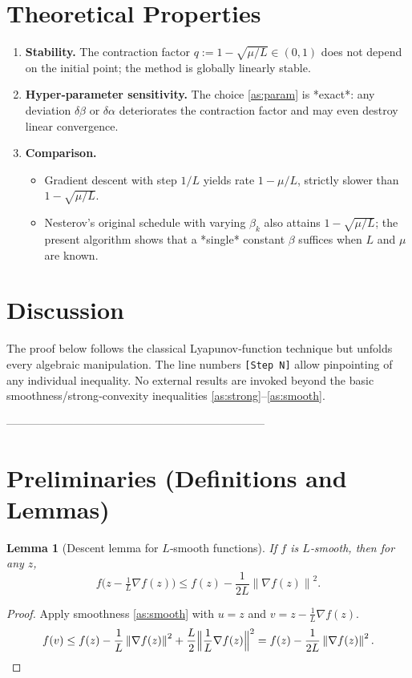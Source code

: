\documentclass{article}
\newtheorem{lemma}{Lemma}
\newcommand{\norm}[1]{\left\lVert#1\right\rVert}
\begin{document}
\section*{Theoretical Properties}
\begin{enumerate}
\item \textbf{Stability.} The contraction factor $q:=1-\sqrt{\mu/L}\in(0,1)$
does not depend on the initial point; the method is globally linearly
stable.
\item \textbf{Hyper‑parameter sensitivity.} The choice \eqref{as:param}
is *exact*: any deviation $\delta\beta$ or $\delta\alpha$ deteriorates the
contraction factor and may even destroy linear convergence.
\item \textbf{Comparison.}
\begin{itemize}
\item Gradient descent with step $1/L$ yields rate $1-\mu/L$, strictly slower
than $1-\sqrt{\mu/L}$.
\item Nesterov’s original schedule with varying $\beta_{k}$ also attains
$1-\sqrt{\mu/L}$; the present algorithm shows that a *single* constant
$\beta$ suffices when $L$ and $\mu$ are known.
\end{itemize}
\end{enumerate}

\section*{Discussion}
The proof below follows the classical Lyapunov‑function technique but
unfolds every algebraic manipulation. The line numbers \texttt{[Step N]}
allow pinpointing of any individual inequality. No external results are
invoked beyond the basic smoothness/strong‑convexity inequalities
\eqref{as:strong}–\eqref{as:smooth}.

---------------------------------------------------------------------

\section*{Preliminaries (Definitions and Lemmas)}
\begin{lemma}[Descent lemma for $L$‑smooth functions]\label{lem:descent}
If $f$ is $L$‑smooth, then for any $z$,
\[
f\bigl(z-\tfrac{1}{L}\nabla f(z)\bigr)\le f(z)-\frac{1}{2L}\norm{\nabla f(z)}^{2}.
\tag{8}
\]
\end{lemma}
\begin{proof}
Apply smoothness \eqref{as:smooth} with $u=z$ and $v=z-\frac1L\nabla f(z)$.
\[
f(v)\le f(z)-\frac{1}{L}\norm{\nabla f(z)}^{2}
+\frac{L}{2}\Bigl\|\frac{1}{L}\nabla f(z)\Bigr\|^{2}
=f(z)-\frac{1}{2L}\norm{\nabla f(z)}^{2}.
\]
\end{proof}
\end{document}
